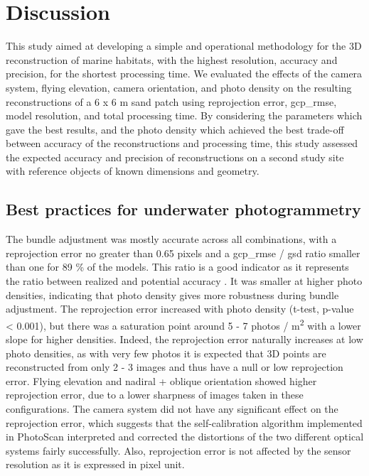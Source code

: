 \section[Discussion]{Discussion}\label{chapitre2_4}
This study aimed at developing a simple and operational methodology for the 3D reconstruction of marine habitats, with the highest resolution, accuracy and precision, for the shortest processing time. We evaluated the effects of the camera system, flying elevation, camera orientation, and photo density on the resulting reconstructions of a 6 x 6 m sand patch using reprojection error, \acrshort{gcp_rmse}, model resolution, and total processing time. By considering the parameters which gave the best results, and the photo density which achieved the best trade-off between accuracy of the reconstructions and processing time, this study assessed the expected accuracy and precision of reconstructions on a second study site with reference objects of known dimensions and geometry.

\subsection{Best practices for underwater photogrammetry}\label{chapitre2_4.1}
The bundle adjustment was mostly accurate across all combinations, with a reprojection error no greater than 0.65 pixels and a \acrshort{gcp_rmse} / \acrshort{gsd} ratio smaller than one for 89 \% of the models. This ratio is a good indicator as it represents the ratio between realized and potential accuracy \citep{forstner_photogrammetric_2016}. It was smaller at higher photo densities, indicating that photo density gives more robustness during bundle adjustment. The reprojection error increased with photo density (t-test, p-value < 0.001), but there was a saturation point around 5 - 7 photos / m\textsuperscript{2} with a lower slope for higher densities. Indeed, the reprojection error naturally increases at low photo densities, as with very few photos it is expected that 3D points are reconstructed from only 2 - 3 images and thus have a null or low reprojection error. Flying elevation and nadiral + oblique orientation showed higher reprojection error, due to a lower sharpness of images taken in these configurations. The camera system did not have any significant effect on the reprojection error, which suggests that the self-calibration algorithm implemented in PhotoScan interpreted and corrected the distortions of the two different optical systems fairly successfully. Also, reprojection error is not affected by the sensor resolution as it is expressed in pixel unit.

